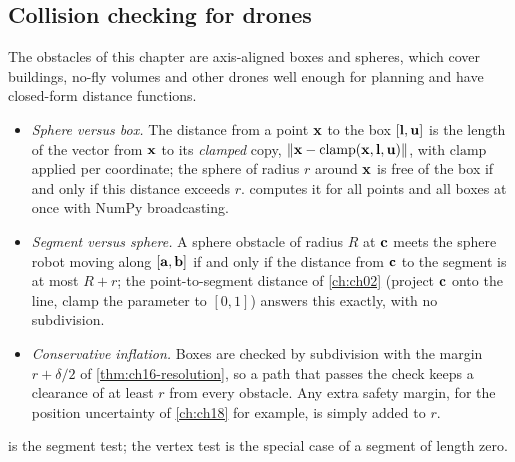 \subsection{Collision checking for drones}
\label{sec:ch16-collision}

The obstacles of this chapter are axis-aligned boxes and spheres, which
cover buildings, no-fly volumes and other drones well enough for planning
and have closed-form distance functions.
\begin{itemize}
  \item \emph{Sphere versus box.} The distance from a point $\mathbf{x}$ to the box
        $[\mathbf{l},\mathbf{u}]$ is the length of the vector from $\mathbf{x}$ to its
        \emph{clamped} copy, $\left\lVert \mathbf{x}-\mathrm{clamp}(\mathbf{x},\mathbf{l},\mathbf{u}) \right\rVert$,
        with $\mathrm{clamp}$ applied per coordinate; the sphere of radius $r$
        around $\mathbf{x}$ is free of the box if and only if this distance exceeds $r$.
         computes it for all points and all boxes
        at once with NumPy broadcasting.
  \item \emph{Segment versus sphere.} A sphere obstacle of radius $R$ at
        $\mathbf{c}$ meets the sphere robot moving along $[\mathbf{a},\mathbf{b}]$ if and only
        if the distance from $\mathbf{c}$ to the segment is at most $R+r$; the
        point-to-segment distance of \cref{ch:ch02} (project $\mathbf{c}$ onto
        the line, clamp the parameter to $[0,1]$) answers this exactly, with
        no subdivision.
  \item \emph{Conservative inflation.} Boxes are checked by subdivision
        with the margin $r+\delta/2$ of \cref{thm:ch16-resolution}, so a path
        that passes the check keeps a clearance of at least $r$ from every
        obstacle. Any extra safety margin, for the position uncertainty of
        \cref{ch:ch18} for example, is simply added to $r$.
\end{itemize}
 is the segment test; the vertex test
 is the special case of a segment of length zero.

